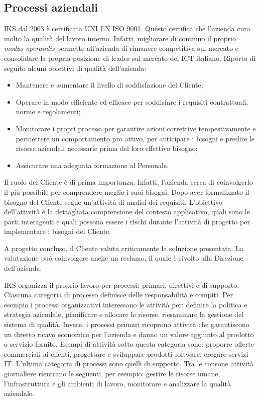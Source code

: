 \subsection{Processi aziendali}

IKS dal 2003 è certificata UNI EN ISO 9001. Questo certifica che 
l'azienda cura molto la qualità del lavoro interno. Infatti, migliorare di continuo 
il proprio \textit{modus operandis} permette all'azienda di rimanere competitiva sul mercato 
e consolidare la propria posizione di leader sul mercato del ICT italiano. 
Riporto di seguito alcuni obiettivi di qualità dell'azienda:
\begin{itemize}
	\item Mantenere e aumentare il livello di soddisfazione del Cliente;
	\item Operare in modo efficiente ed efficace per soddisfare i requisiti contrattuali, 
	      norme e regolamenti;
	\item Monitorare i propri processi per garantire azioni correttive 
	      tempestivamente e permettere un comportamento pro attivo, per 
	      anticipare i bisogni e predire le risorse aziendali necessarie 
	      prima del loro effettivo bisogno; 
	\item Assicurare una adeguata formazione al Personale.
\end{itemize}


Il ruolo del Cliente è di prima importanza. Infatti, l'azienda cerca di coinvolgerlo
il più possibile per comprendere meglio i suoi bisogni. Dopo aver formalizzato 
il bisogno del Cliente segue un'attività di analisi dei requisiti. L'obiettivo dell'attività 
è la dettagliata comprensione del contesto applicativo, quali sono le parti interagenti e quali 
possono essere i rischi durante l'attività di progetto per implementare i bisogni del Cliente.

A progetto concluso, il Cliente valuta criticamente la soluzione presentata. 
La valutazione può coinvolgere anche un reclamo, il quale è rivolto alla Direzione dell'azienda.

IKS organizza il proprio lavoro per processi: primari, direttivi e di supporto. Ciascuna categoria 
di processo definisce delle responsabilità e compiti. Per esempio i processi organizzativi interessano 
le attività per: definire la politica e strategia aziendale, pianificare e allocare le risorse, 
riesaminare la gestione del sistema di qualità. Invece, i processi primari ricoprono attività 
che garantiscono un diretto ricavo economico per l'azienda e danno un valore aggiunto al prodotto
o servizio fornito. Esempi di attività sotto questa categoria sono: proporre offerte commerciali ai 
clienti, progettare e sviluppare  prodotti software, erogare servizi IT.
L'ultima categoria di processi sono quelli di supporto. Tra le consone attività giornaliere rientrano
le seguenti, per esempio: gestire le risorse umane, l'infrastruttura e gli ambienti di lavoro, 
monitorare e analizzare la qualità aziendale. 

